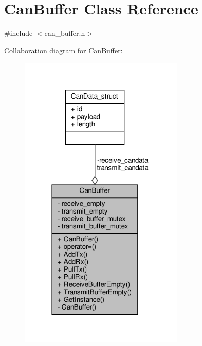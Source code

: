 \hypertarget{classCanBuffer}{}\section{Can\+Buffer Class Reference}
\label{classCanBuffer}


{\ttfamily \#include $<$can\+\_\+buffer.\+h$>$}



Collaboration diagram for Can\+Buffer\+:
\nopagebreak
\begin{figure}[H]
\begin{center}
\leavevmode
\includegraphics[width=222pt]{classCanBuffer__coll__graph}
\end{center}
\end{figure}
